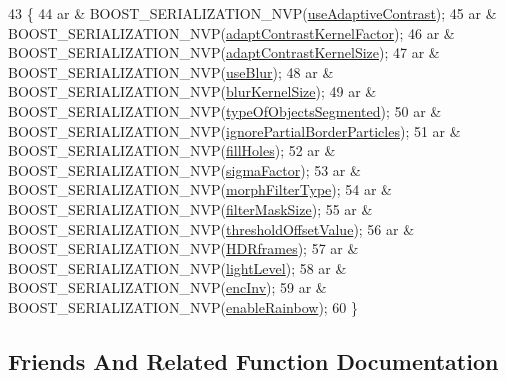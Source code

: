 \begin{DoxyCode}
43         \{
44             ar & BOOST\_SERIALIZATION\_NVP(\hyperlink{class_soil_analyzer_1_1_soil_settings_a0e27335d05aed8f3f084744062368578}{useAdaptiveContrast});
45             ar & BOOST\_SERIALIZATION\_NVP(\hyperlink{class_soil_analyzer_1_1_soil_settings_ace12c0f4bc35d420ef528cc390fc2cdb}{adaptContrastKernelFactor});
46             ar & BOOST\_SERIALIZATION\_NVP(\hyperlink{class_soil_analyzer_1_1_soil_settings_a73f627b092dbdbda37b66ef6c2eef95c}{adaptContrastKernelSize});
47             ar & BOOST\_SERIALIZATION\_NVP(\hyperlink{class_soil_analyzer_1_1_soil_settings_a21bd246a48a712734af86f592030e18b}{useBlur});
48             ar & BOOST\_SERIALIZATION\_NVP(\hyperlink{class_soil_analyzer_1_1_soil_settings_afa46542d30045e00fadbdd5a6ab9a1e1}{blurKernelSize});
49             ar & BOOST\_SERIALIZATION\_NVP(\hyperlink{class_soil_analyzer_1_1_soil_settings_a21ae88dba6b9b0b07d9c26812bc739fb}{typeOfObjectsSegmented});
50             ar & BOOST\_SERIALIZATION\_NVP(\hyperlink{class_soil_analyzer_1_1_soil_settings_a24fb1d7da2247da77a17d853ea1494d7}{ignorePartialBorderParticles});
51             ar & BOOST\_SERIALIZATION\_NVP(\hyperlink{class_soil_analyzer_1_1_soil_settings_a2c9dbe9429742aed1da9d9683da5cc1e}{fillHoles});
52             ar & BOOST\_SERIALIZATION\_NVP(\hyperlink{class_soil_analyzer_1_1_soil_settings_a97e62512e12a2ba9210fd93950b6e717}{sigmaFactor});
53             ar & BOOST\_SERIALIZATION\_NVP(\hyperlink{class_soil_analyzer_1_1_soil_settings_ad1420c4800badb3eb07eba4767e3df81}{morphFilterType});
54             ar & BOOST\_SERIALIZATION\_NVP(\hyperlink{class_soil_analyzer_1_1_soil_settings_ad9d5071bbf6d10638df024e883c6199f}{filterMaskSize});
55             ar & BOOST\_SERIALIZATION\_NVP(\hyperlink{class_soil_analyzer_1_1_soil_settings_a48330eb812672b50a94483f264614e8f}{thresholdOffsetValue});
56             ar & BOOST\_SERIALIZATION\_NVP(\hyperlink{class_soil_analyzer_1_1_soil_settings_a77e631ff44efe74762b5adaa2eb2cd11}{HDRframes});
57             ar & BOOST\_SERIALIZATION\_NVP(\hyperlink{class_soil_analyzer_1_1_soil_settings_aa4d3ed8c1ab6551bfa4763e8a1ffc148}{lightLevel});
58             ar & BOOST\_SERIALIZATION\_NVP(\hyperlink{class_soil_analyzer_1_1_soil_settings_ad831e13b61fc2097219bbf7252f045d5}{encInv});
59             ar & BOOST\_SERIALIZATION\_NVP(\hyperlink{class_soil_analyzer_1_1_soil_settings_a9ece0b96eb8614a497fba3a19d8b4da1}{enableRainbow});
60         \}
\end{DoxyCode}


\subsection{Friends And Related Function Documentation}
\hypertarget{class_soil_analyzer_1_1_soil_settings_ac98d07dd8f7b70e16ccb9a01abf56b9c}{}
